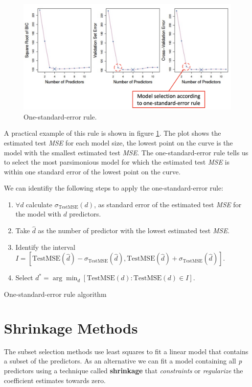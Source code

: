\begin{figure}
    \centering
    \includegraphics[width=0.8\linewidth]{./figures/chapter_4/onestandarderror.png}
    \caption{One-standard-error rule.}
    \label{fig:lec_15_one_standard_error_rule}
\end{figure}

A practical example of this rule is shown in figure \ref{fig:lec_15_one_standard_error_rule}. The plot shows the estimated test \textit{MSE} for each model size, the lowest point on the curve is the model with the smallest estimated test \textit{MSE}. The one-standard-error rule tells us to select the most parsimonious model for which the estimated test \textit{MSE} is within one standard error of the lowest point on the curve.

We can identifiy the following steps to apply the one-standard-error rule: %
\begin{algorithm}
    \begin{enumerate}
        \item $\forall d$ calculate $\sigma_{\text{TestMSE}}(d)$, as standard error of the estimated test \textit{MSE} for the model with $d$ predictors.
        \item Take $\hat d$ as the number of predictor with the lowest estimated test \textit{MSE}.
        \item Identify the interval $I = [\text{TestMSE}(\hat d) - \sigma_{\text{TestMSE}}(\hat d), \text{TestMSE}(\hat d) + \sigma_{\text{TestMSE}}(\hat d)]$.
        \item Select $d^\ast = \arg\min_d[\text{TestMSE}(d) : \text{TestMSE}(d) \in I]$.
    \end{enumerate}
    \caption{One-standard-error rule algorithm}
\end{algorithm}


\section{Shrinkage Methods}
The subset selection methods use least squares to fit a linear model that contains a subset of the predictors. As an alternative we can fit a model containing all \textit{p} predictors using a technique called \textbf{shrinkage} that \textit{constraints} or \textit{regularize} the coefficient estimates towards zero.

